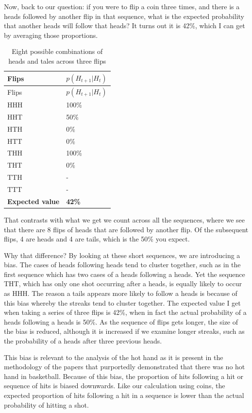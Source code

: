 \documentclass[
  letterpaper,
  DIV=11,
  numbers=noendperiod]{scrreprt}
\begin{document}
Now, back to our question: if you were to flip a coin three times, and
there is a heads followed by another flip in that sequence, what is the
expected probability that another heads will follow that heads? It turns
out it is 42\%, which I can get by averaging those proportions.

\hypertarget{tbl-hothand}{}
\begin{longtable}[]{@{}ll@{}}
\caption{\label{tbl-hothand}Eight possible combinations of heads and
tales across three flips}\tabularnewline
\toprule()
Flips & \(p(H_{t+1}|H_t)\) \\
\midrule()
\endfirsthead
\toprule()
Flips & \(p(H_{t+1}|H_t)\) \\
\midrule()
\endhead
HHH & 100\% \\
HHT & 50\% \\
HTH & 0\% \\
HTT & 0\% \\
THH & 100\% \\
THT & 0\% \\
TTH & - \\
TTT & - \\
\textbf{Expected value} & \textbf{42\%} \\
\bottomrule()
\end{longtable}

That contrasts with what we get we count across all the sequences, where
we see that there are 8 flips of heads that are followed by another
flip. Of the subsequent flips, 4 are heads and 4 are tails, which is the
50\% you expect.

Why that difference? By looking at these short sequences, we are
introducing a bias. The cases of heads following heads tend to cluster
together, such as in the first sequence which has two cases of a heads
following a heads. Yet the sequence THT, which has only one shot
occurring after a heads, is equally likely to occur as HHH. The reason a
tails appears more likely to follow a heads is because of this bias
whereby the streaks tend to cluster together. The expected value I get
when taking a series of three flips is 42\%, when in fact the actual
probability of a heads following a heads is 50\%. As the sequence of
flips gets longer, the size of the bias is reduced, although it is
increased if we examine longer streaks, such as the probability of a
heads after three previous heads.

This bias is relevant to the analysis of the hot hand as it is present
in the methodology of the papers that purportedly demonstrated that
there was no hot hand in basketball. Because of this bias, the
proportion of hits following a hit or sequence of hits is biased
downwards. Like our calculation using coins, the expected proportion of
hits following a hit in a sequence is lower than the actual probability
of hitting a shot.
\end{document}

